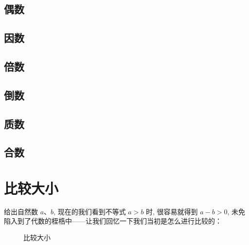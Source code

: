 \subsection{偶数} \label{subsec:even-number}

\subsection{因数} \label{subsec:factor}

\subsection{倍数} \label{subsec:multiple}

\subsection{倒数} \label{subsec:reciprocal}

\subsection{质数} \label{subsec:prime-number}

\subsection{合数} \label{subsec:composite-number}

\section{比较大小} \label{sec:compare-size}

给出自然数 $a$、$b$, 现在的我们看到不等式 $a > b$ 时, 很容易就得到 $a - b > 0$, 未免陷入到了代数的桎梏中——让我们回忆一下我们当初是怎么进行比较的：

\begin{figure}[H]
  \small
  \centering
  \caption{比较大小} \label{fig:compare}
\end{figure}

